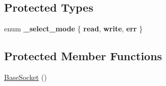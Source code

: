 \subsection*{Protected Types}
\begin{CompactItemize}
\item 
enum \textbf{\_\-select\_\-mode} \{ \textbf{read}, 
\textbf{write}, 
\textbf{err}
 \}
\subsection*{Protected Member Functions}
\begin{CompactItemize}
\item 
\hypertarget{classsocketpp_1_1BaseSocket_3eb81ecbf94ce83afa6b2f60206c77f2}{
\hyperlink{classsocketpp_1_1BaseSocket_3eb81ecbf94ce83afa6b2f60206c77f2}{BaseSocket} ()}
\label{classsocketpp_1_1BaseSocket_3eb81ecbf94ce83afa6b2f60206c77f2}


\end{CompactItemize}
\end{CompactItemize}
